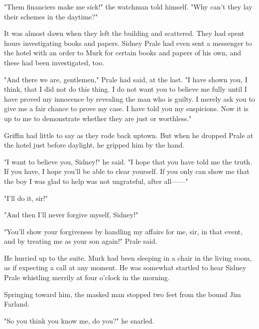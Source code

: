 \documentclass{novel}
\begin{document}
"Them financiers make me sick!" the watchman told himself. "Why can't they lay their schemes in the daytime?"

It was almost dawn when they left the building and scattered. They had spent hours investigating books and papers. Sidney Prale had even sent a messenger to the hotel with an order to Murk for certain books and papers of his own, and these had been investigated, too.

"And there we are, gentlemen," Prale had said, at the last. "I have shown you, I think, that I did not do this thing. I do not want you to believe me fully until I have proved my innocence by revealing the man who is guilty. I merely ask you to give me a fair chance to prove my case. I have told you my suspicions. Now it is up to me to demonstrate whether they are just or worthless."

Griffin had little to say as they rode back uptown. But when he dropped Prale at the hotel just before daylight, he gripped him by the hand.

"I want to believe you, Sidney!" he said. "I hope that you have told me the truth. If you have, I hope you'll be able to clear yourself. If you only can show me that the boy I was glad to help was not ungrateful, after all------"

"I'll do it, sir!"

"And then I'll never forgive myself, Sidney!"

"You'll show your forgiveness by handling my affairs for me, sir, in that event, and by treating me as your son again!" Prale said.

He hurried up to the suite. Murk had been sleeping in a chair in the living room, as if expecting a call at any moment. He was somewhat startled to hear Sidney Prale whistling merrily at four o'clock in the morning.

\vspace{2\nbs}
\clearpage
\thispagestyle{empty}

\begin{ChapterStart}
\vspace{3\nbs}
\end{ChapterStart}
    
Springing toward him, the masked man stopped two feet from the bound Jim Farland.

"So you think you know me, do you?" he snarled.
\end{document}
